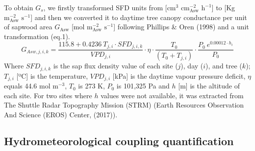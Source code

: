 \documentclass[11pt,twoside]{reedthesis}
\begin{document}
To obtain \(G_s\), we firstly transformed SFD units from
{[}\(\text{cm}^3\) \(\text{cm}^{-2}_{\text{Asw}}\) \(\text{h}^{-1}\){]}
to {[}Kg \(\text{m}^{-2}_{\text{Asw}}\) \(\text{s}^{-1}\){]} and then we
converted it to daytime tree canopy conductance per unit of sapwood area
\(G_{\text{Asw}}\) {[}mol \(\text{m}^{-2}_{\text{Asw}}\)
\(\text{s}^{-1}\){]} following Phillips \& Oren (1998) and a unit
transformation (eq.1).
\begin{equation}
G_{Asw,j,i,k} = \frac{115.8 + 0.4236 \: T_{j , i} \cdot SFD_{j , i , k}}{VPD_{j,i}}\cdot \eta \cdot \frac{T_0}{(T_0 + T_{j,i})} \cdot \frac{P_0 \: e^{0.00012 \cdot h_i}}{P_0}
\end{equation}
Where \(SFD_{j,i,k}\) is the sap flux density value of each site
(\(j\)), day (\(i\)), and tree (\(k\)); \({T}_{j,i}\) {[}ºC{]} is the
temperature, \(VPD_{j,i}\) {[}kPa{]} is the daytime vapour pressure
deficit, \(\eta\) equals 44.6 mol \(\text{m}^{-3}\), \(T_0\) is 273 K,
\(P_0\) is 101,325 Pa and \(h\) {[}m{]} is the altitude of each site.
For two sites where \(h\) values were not available, it was extracted
from The Shuttle Radar Topography Mission (STRM) (Earth Resources
Observation And Science (EROS) Center, (2017)).\par

\subsection{Hydrometeorological coupling
quantification}\label{hydrometeorological-coupling-quantification}
\end{document}
